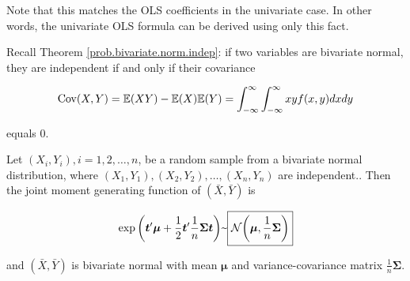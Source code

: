 \begin{remark}Note that this matches the OLS coefficients in the univariate case. In other words, the univariate OLS formula can be derived using only this fact.\end{remark}

Recall Theorem \ref{prob.bivariate.norm.indep}: if two variables are bivariate normal, they are independent if and only if their covariance 

\[
\Cov(X, Y) = \E(XY) - \E(X)\E(Y) = \int_{-\infty}^\infty \int_{-\infty}^\infty xy f(x, y) dx dy
\] 

equals 0. 

\begin{proposition} Let \((X_i, Y_i), i = 1, 2, \ldots , n\), be a random sample from a bivariate normal distribution, where  \((X_1, Y_1), (X_2, Y_2), \ldots ,(X_n, Y_n)\) are independent.. Then the joint moment generating function of \((\bar{X}, \bar{Y})\) is

\[
 \exp\bigg( \boldsymbol{t}' \boldsymbol{\mu} + \frac{1}{2} \boldsymbol{t}' \frac{1}{n}  \boldsymbol{\Sigma} \boldsymbol{t} \bigg) \textapprox \boxed{\mathcal{N}\bigg(\boldsymbol{\mu}, \frac{1}{n}\boldsymbol{\Sigma}\bigg)}
\]

and \((\bar{X}, \bar{Y})\) is bivariate normal with mean \(\boldsymbol{\mu}\) and variance-covariance matrix \(\frac{1}{n}\boldsymbol{\Sigma}\).

\end{proposition}

